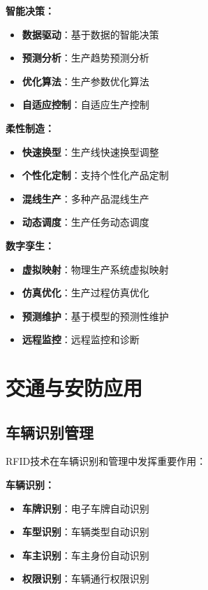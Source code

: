 \documentclass[12pt,UTF8]{ctexbook}
\begin{document}
\begin{itemize}[leftmargin=3.5em]
\begin{itemize}[leftmargin=3.5em]
\begin{itemize}[leftmargin=3.5em]
\begin{itemize}[leftmargin=3.5em]
\textbf{智能决策：}
\begin{itemize}[leftmargin=3.5em]
    \item \textbf{数据驱动}：基于数据的智能决策
    \item \textbf{预测分析}：生产趋势预测分析
    \item \textbf{优化算法}：生产参数优化算法
    \item \textbf{自适应控制}：自适应生产控制
\end{itemize}

\textbf{柔性制造：}
\begin{itemize}[leftmargin=3.5em]
    \item \textbf{快速换型}：生产线快速换型调整
    \item \textbf{个性化定制}：支持个性化产品定制
    \item \textbf{混线生产}：多种产品混线生产
    \item \textbf{动态调度}：生产任务动态调度
\end{itemize}

\textbf{数字孪生：}
\begin{itemize}[leftmargin=3.5em]
    \item \textbf{虚拟映射}：物理生产系统虚拟映射
    \item \textbf{仿真优化}：生产过程仿真优化
    \item \textbf{预测维护}：基于模型的预测性维护
    \item \textbf{远程监控}：远程监控和诊断
\end{itemize}

\chapter{交通与安防应用}

\section{车辆识别管理}

RFID技术在车辆识别和管理中发挥重要作用：

\textbf{车辆识别：}
\begin{itemize}[leftmargin=3.5em]
    \item \textbf{车牌识别}：电子车牌自动识别
    \item \textbf{车型识别}：车辆类型自动识别
    \item \textbf{车主识别}：车主身份自动识别
    \item \textbf{权限识别}：车辆通行权限识别
\end{itemize}


\end{itemize}
\end{itemize}
\end{itemize}
\end{itemize}
\end{document}

